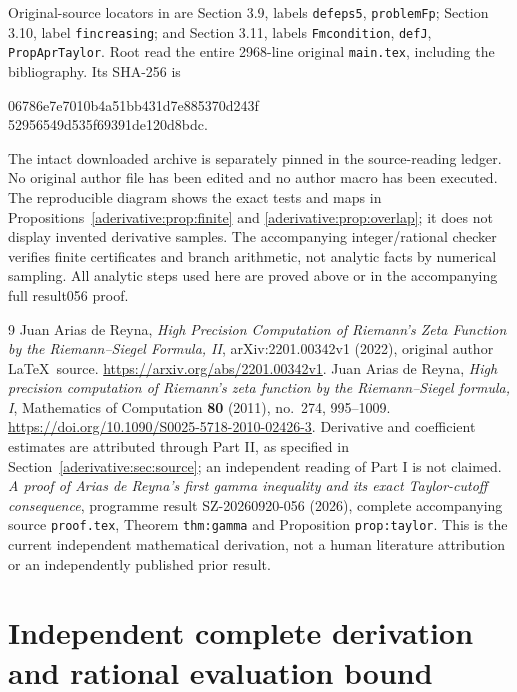 \documentclass[11pt]{article}
\begin{document}
Original-source locators in \cite{aderivative:AriasII} are
Section 3.9, labels \texttt{defeps5}, \texttt{problemFp};
Section 3.10, label \texttt{fincreasing}; and
Section 3.11, labels \texttt{Fmcondition}, \texttt{defJ},
\texttt{PropAprTaylor}. Root read the entire 2968-line
original \texttt{main.tex}, including the bibliography.
Its SHA-256 is
\begin{center}\small\ttfamily
06786e7e7010b4a51bb431d7e885370d243f\\
52956549d535f69391de120d8bdc.
\end{center}
The intact downloaded archive is separately pinned in the
source-reading ledger. No original author file has been
edited and no author macro has been executed.
The reproducible diagram shows the exact tests and maps
in Propositions~\ref{aderivative:prop:finite} and \ref{aderivative:prop:overlap};
it does not display invented derivative samples.
The accompanying integer/rational checker verifies finite
certificates and branch arithmetic, not analytic facts
by numerical sampling. All analytic steps used here are
proved above or in the accompanying full result056 proof.

\begin{thebibliography}{9}
Juan Arias de Reyna,
\emph{High Precision Computation of Riemann's Zeta Function
by the Riemann--Siegel Formula, II}, arXiv:2201.00342v1
(2022), original author \LaTeX\ source.
\url{https://arxiv.org/abs/2201.00342v1}.
Juan Arias de Reyna,
\emph{High precision computation of Riemann's zeta function
by the Riemann--Siegel formula, I}, Mathematics of
Computation \textbf{80} (2011), no.~274, 995--1009.
\url{https://doi.org/10.1090/S0025-5718-2010-02426-3}.
Derivative and coefficient estimates are attributed
through Part II, as specified in Section~\ref{aderivative:sec:source};
an independent reading of Part I is not claimed.
\emph{A proof of Arias de Reyna's first gamma inequality
and its exact Taylor-cutoff consequence}, programme
result SZ-20260920-056 (2026), complete accompanying
source \texttt{proof.tex}, Theorem \texttt{thm:gamma}
and Proposition \texttt{prop:taylor}. This is the current
independent mathematical derivation, not a human literature
attribution or an independently published prior result.
\end{thebibliography}

\endgroup

\clearpage\begingroup
\part*{Independent complete derivation and rational evaluation bound}
\providecommand{\aindependenttightlist}{\setlength{\itemsep}{0pt}\setlength{\parskip}{0pt}}
\end{document}
